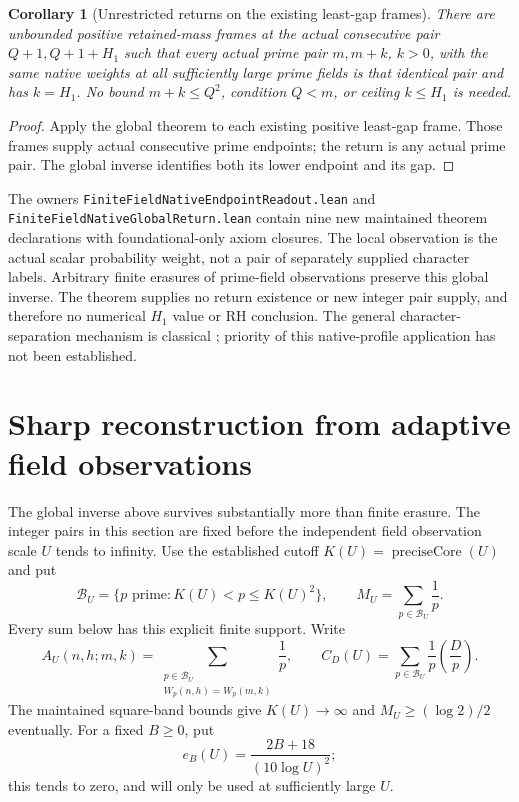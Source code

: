 \documentclass[11pt]{article}
\newtheorem{corollary}[theorem]{Corollary}
\begin{document}
\begin{corollary}[Unrestricted returns on the existing least-gap frames]
\label{cor:native-global-least-gap}
There are unbounded positive retained-mass frames at the actual
consecutive pair \(Q+1,Q+1+H_1\) such that every actual prime pair
\(m,m+k\), \(k>0\), with the same native weights at all sufficiently
large prime fields is that identical pair and has \(k=H_1\).
No bound \(m+k\le Q^2\), condition \(Q<m\), or ceiling \(k\le H_1\)
is needed.
\end{corollary}
\begin{proof}
Apply the global theorem to each existing positive least-gap frame.
Those frames supply actual consecutive prime endpoints; the return
is any actual prime pair. The global inverse identifies both its
lower endpoint and its gap.
\end{proof}

The owners \texttt{FiniteFieldNativeEndpointReadout.lean} and
\texttt{FiniteFieldNativeGlobalReturn.lean} contain nine new maintained
theorem declarations with foundational-only axiom closures.
The local observation is the actual scalar probability weight, not
a pair of separately supplied character labels. Arbitrary finite
erasures of prime-field observations preserve this global inverse.
The theorem supplies no return existence or new integer pair supply,
and therefore no numerical \(H_1\) value or RH conclusion.
The general character-separation mechanism is classical
\cite{LauWuLeastNonresidue}; priority of this native-profile application
has not been established.


\section{Sharp reconstruction from adaptive field observations}
\label{sec:native-half-retention}

The global inverse above survives substantially more than finite erasure.
The integer pairs in this section are fixed before the independent field
observation scale \(U\) tends to infinity. Use the established cutoff
\(K(U)=\operatorname{preciseCore}(U)\) and put
\[
 \mathcal B_U=\{p\text{ prime}:K(U)<p\le K(U)^2\},\qquad
 M_U=\sum_{p\in\mathcal B_U}\frac1p.
\]
Every sum below has this explicit finite support. Write
\[
 A_U(n,h;m,k)=
 \sum_{\substack{p\in\mathcal B_U\\W_p(n,h)=W_p(m,k)}}\frac1p,
 \qquad
 C_D(U)=\sum_{p\in\mathcal B_U}\frac1p\left(\frac Dp\right).
\]
The maintained square-band bounds give \(K(U)\to\infty\) and
\(M_U\ge(\log2)/2\) eventually. For a fixed \(B\ge0\), put
\[
 e_B(U)=\frac{2B+18}{(10\log U)^2};
\]
this tends to zero, and will only be used at sufficiently large \(U\).
\end{document}
